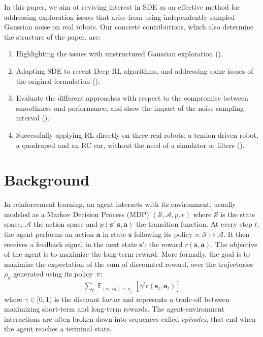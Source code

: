 \documentclass{article}
\newcommand{\E}[2]{\operatorname{\mathbb{E}}_{#1}\left[#2\right]}
\newcommand{\sspace}{\mathcal{S}}
\newcommand{\aspace}{\mathcal{A}}
\newcommand{\state}{\mathbf{s}}
\newcommand{\reward}{r}
\newcommand{\action}{\mathbf{a}}
\newcommand{\at}{{\action_t}}
\newcommand{\st}{{\state_t}}
\newcommand{\policy}{\pi}
\newcommand{\SDE}{\textsc{SDE}\xspace}
\begin{document}
In this paper, we aim at reviving interest in \SDE as an effective method for addressing exploration issues that arise from using independently sampled Gaussian noise on real robots. Our concrete contributions, which also determine the structure of the paper, are:
\begin{enumerate}
  \item Highlighting the issues with unstructured Gaussian exploration ().
  \item Adapting \SDE to recent Deep RL algorithms, and addressing some issues of the original formulation ().
  \item Evaluate the different approaches with respect to the compromise between smoothness and performance, and show the impact of the noise sampling interval ().
  \item Successfully applying RL directly on three real robots: a tendon-driven robot, a quadruped and an RC car, without the need of a simulator or filters ().
\end{enumerate}


\section{Background}
\label{sec:background}

In reinforcement learning, an agent interacts with its environment, usually modeled as a Markov Decision Process (MDP) $(\sspace, \aspace, p, \reward)$ where $\sspace$ is the state space, $\aspace$ the action space and $p(\state'|\state, \action)$ the transition function. At every step $t$, the agent performs an action $\action$ in state $\state$ following its policy $\policy : \sspace \mapsto \aspace$. It then receives a feedback signal in the next state $\state'$: the reward $\reward(\state, \action)$. The objective of the agent is to maximize the long-term reward. More formally, the goal is to maximize the expectation of the sum of discounted reward, over the trajectories $\rho_\policy$ generated using its policy~$\policy$:
\begin{align}
  \label{eq:rl_obj}
  \sum_t \E{(\st,\at)\sim\rho_\policy}{\gamma^t \reward(\st,\at)}
\end{align}
where $\gamma \in [0,1)$ is the discount factor and represents a trade-off between maximizing short-term and long-term rewards.
The agent-environment interactions are often broken down into sequences called \textit{episodes}, that end when the agent reaches a terminal state.
\end{document}
